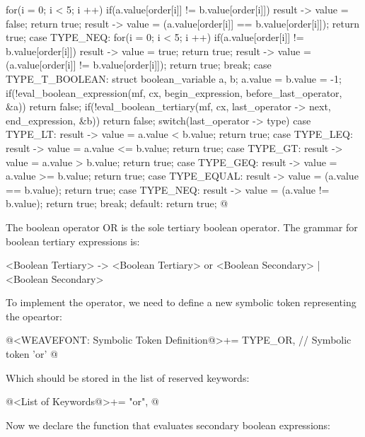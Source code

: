 {{{{{{{{{{          for(i = 0; i < 5; i ++)
            if(a.value[order[i]] != b.value[order[i]]){
              result -> value = false;
              return true;
            }
          result -> value = (a.value[order[i]] == b.value[order[i]]);
          return true;
        case TYPE_NEQ:
          for(i = 0; i < 5; i ++)
            if(a.value[order[i]] != b.value[order[i]]){
              result -> value = true;
              return true;
            }
          result -> value = (a.value[order[i]] != b.value[order[i]]);
          return true;
      }          
      break;
    }
    case TYPE_T_BOOLEAN:
    {
      struct boolean_variable a, b;
      a.value = b.value = -1;
      if(!eval_boolean_expression(mf, cx, begin_expression,
                                  before_last_operator, &a))
        return false;
      if(!eval_boolean_tertiary(mf, cx, last_operator -> next,
                                end_expression, &b))
        return false;
      switch(last_operator -> type){
      case TYPE_LT:
        result -> value = a.value < b.value;
        return true;
      case TYPE_LEQ:
        result -> value = a.value <= b.value;
        return true;
      case TYPE_GT:
        result -> value = a.value > b.value;
        return true;
      case TYPE_GEQ:
        result -> value = a.value >= b.value;
        return true;
      case TYPE_EQUAL:
        result -> value = (a.value == b.value);
        return true;
      case TYPE_NEQ:
        result -> value = (a.value != b.value);
        return true;
      }
      break;
    }
    default:
    }
    return true;
  }
}
@
\fimcodigo


The boolean operator OR is the sole tertiary boolean operator. The
grammar for boolean tertiary expressions is:

\alinhaverbatim
<Boolean Tertiary> -> <Boolean Tertiary> or <Boolean Secondary> |
                      <Boolean Secondary>
\alinhanormal

To implement the operator, we need to define a new symbolic token
representing the  opeartor:

\iniciocodigo
@<WEAVEFONT: Symbolic Token Definition@>+=
TYPE_OR,                    // Symbolic token 'or'
@
\fimcodigo

Which should be stored in the list of reserved keywords:

\iniciocodigo
@<List of Keywords@>+=
"or",
@
\fimcodigo

Now we declare the function that evaluates secondary boolean
expressions:

}}}}}
